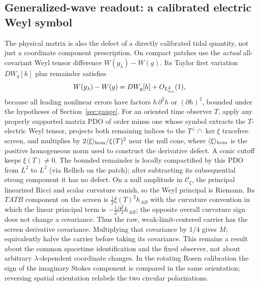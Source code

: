 \documentclass[11pt]{article}
\begin{document}
\subsection{Generalized-wave readout: a calibrated electric Weyl symbol}\label{sec:genread}
The physical matrix is also the defect of a directly calibrated tidal quantity, not just a coordinate component prescription. On compact patches use the \emph{actual} all-covariant Weyl tensor difference \(W(g_\lambda)-W(g)\). Its Taylor first variation \(DW_g[h]\) plus remainder satisfies
\[
 W(g_\lambda)-W(g)=DW_g[h]+O_{L^2_{\rm loc}}(1),
\]
because all leading nonlinear errors have factors \(h\,\partial^2h\) or \((\partial h)^2\), bounded under the hypotheses of Section~\ref{sec:gauge}. For an oriented time observer \(T\), apply any properly supported matrix PDO of order minus one whose symbol extracts the \(T\)-electric Weyl tensor, projects both remaining indices to the \(T^\perp\cap\ker\xi\) tracefree screen, and multiplies by \(2\langle\xi\rangle_{\rm hom}/\xi(T)^2\) near the null cone, where \(\langle\xi\rangle_{\rm hom}\) is the positive homogeneous norm used to construct the derivative defect. A conic cutoff keeps \(\xi(T)\ne0\). The bounded remainder is locally compactified by this PDO from \(L^2\) to \(L^2\) (via Rellich on the patch); after subtracting its subsequential strong component it has no defect. On a null amplitude in \(\mathcal C_\xi\), the principal linearized Ricci and scalar curvature vanish, so the Weyl principal is Riemann. Its \(TATB\) component on the screen is \(\frac12 \xi(T)^2h_{AB}\) with the curvature convention in which the linear principal term is \(-\frac12\partial_T^2 h_{AB}\); the opposite overall curvature sign does not change a covariance. Thus the raw, weak-limit-centered carrier has the screen derivative covariance. Multiplying that covariance by \(1/4\) gives \(M\); equivalently halve the carrier before taking its covariance. This remains a result about the common spacetime identification and the fixed observer, not about arbitrary \(\lambda\)-dependent coordinate changes. In the rotating Rosen calibration the sign of the imaginary Stokes component is compared in the same orientation; reversing spatial orientation relabels the two circular polarizations.
\end{document}
